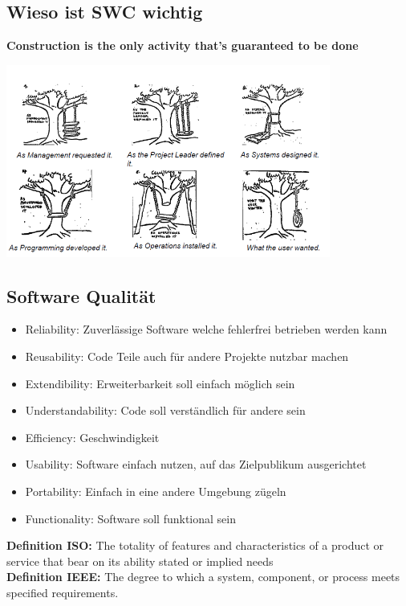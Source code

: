 \documentclass[10pt]{article}
\begin{document}
    \subsection{Wieso ist SWC wichtig}
    \textbf{Construction is the only activity that's guaranteed to be done}
    \begin{center}
        \includegraphics[width=0.8\textwidth]{assets/typical_project.png}
    \end{center}

    \subsection{Software Qualit\"at}
    \begin{itemize}
        \item Reliability: Zuverl\"assige Software welche fehlerfrei betrieben werden kann
        \item Reusability: Code Teile auch f\"ur andere Projekte nutzbar machen
        \item Extendibility: Erweiterbarkeit soll einfach m\"oglich sein
        \item Understandability: Code soll verst\"andlich f\"ur andere sein
        \item Efficiency: Geschwindigkeit
        \item Usability: Software einfach nutzen, auf das Zielpublikum ausgerichtet
        \item Portability: Einfach in eine andere Umgebung z\"ugeln
        \item Functionality: Software soll funktional sein
    \end{itemize}
    \textbf{Definition ISO:} The totality of features and characteristics of a product or service that bear on its ability stated or implied needs
    \\
    \textbf{Definition IEEE:} The degree to which a system, component, or process meets specified requirements.
\end{document}
